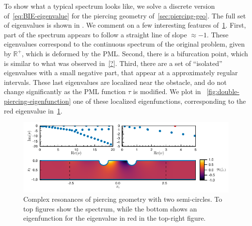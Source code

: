 \documentclass[review,hidelinks,onefignum,onetabnum]{siamart220329}
\newcommand{\R}{\mathbb{R}}
\begin{document}
To show what a typical spectrum looks like, we solve a discrete version of~\cref{eq:BIE-eigenvalue} for the piercing geometry of~\cref{sec:piercing-geo}. The full set of eigenvalues is shown in . We comment on a few interesting features of~\cref{fig:double-piercing-spectrum}. First, part of the spectrum appears to follow a straight line of slope $\approx -1$. These eigenvalues correspond to the continuous spectrum of the original problem, given by $\R^+$, which is deformed by the PML. Second, there is a bifurcation point, which is similar to what was observed in~\cref{?}. Third, there are a set of ``isolated'' eigenvalues with a small negative part, that appear at a approximately regular intervals. These last eigenvalues are localized near the obstacle, and do not change significantly as the PML function $\tau$ is modified. We plot in ~\cref{fig:double-piercing-eigenfunction} one of these localized eigenfunctions, corresponding to the red eigenvalue in~\cref{fig:double-piercing-spectrum}. 
\begin{figure}[ht!]
  \centering
  \includegraphics[width=1\textwidth]{eigenvalue_problem.pdf}
  \vspace{-20pt}
  \caption{Complex resonances of piercing geometry with two semi-circles. To top figures show the spectrum, while the bottom shows an eigenfunction for the eigenvalue in red in the top-right figure.}
  \label{fig:double-piercing-spectrum}
\end{figure}


\end{document}
